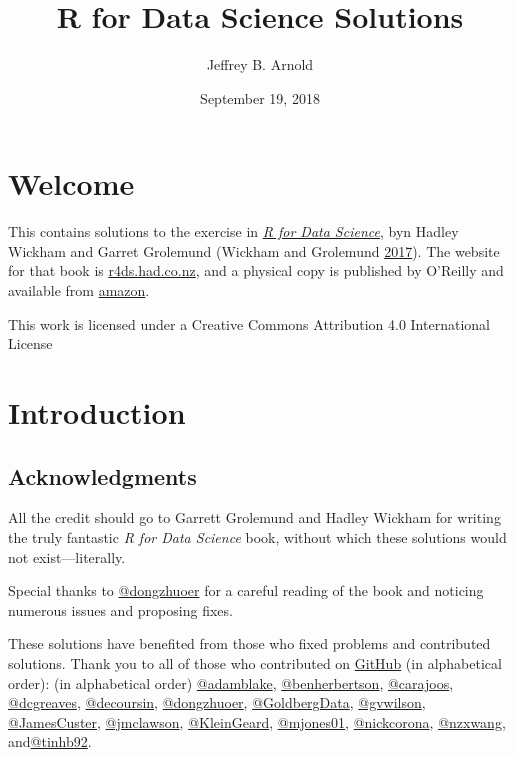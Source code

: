 \documentclass[]{book}
\title{R for Data Science Solutions}
\author{Jeffrey B. Arnold}
\date{September 19, 2018}
\theoremstyle{plain}
\theoremstyle{remark}
\begin{document}
\maketitle

{
\setcounter{tocdepth}{1}
\tableofcontents
}
\hypertarget{welcome}{%
\chapter*{Welcome}\label{welcome}}

This contains solutions to the exercise in
\href{http://amzn.to/2aHLAQ1}{\emph{R for Data Science}}, byn Hadley
Wickham and Garret Grolemund (Wickham and Grolemund
\protect\hyperlink{ref-WickhamGrolemund2017}{2017}). The website for
that book is \href{http://r4ds.had.co.nz/}{r4ds.had.co.nz}, and a
physical copy is published by O'Reilly and available from
\href{http://amzn.to/2aHLAQ1}{amazon}.

This work is licensed under a Creative Commons Attribution 4.0
International License

\hypertarget{introduction}{%
\chapter{Introduction}\label{introduction}}

\hypertarget{acknowledgments}{%
\section*{Acknowledgments}\label{acknowledgments}}

All the credit should go to Garrett Grolemund and Hadley Wickham for
writing the truly fantastic \emph{R for Data Science} book, without
which these solutions would not exist---literally.

Special thanks to \href{https://github.com/dongzhuoer}{@dongzhuoer} for
a careful reading of the book and noticing numerous issues and proposing
fixes.

These solutions have benefited from those who fixed problems and
contributed solutions. Thank you to all of those who contributed on
\href{https://github.com/jrnold/r4ds-exercise-solutions/graphs/contributors}{GitHub}
(in alphabetical order): (in alphabetical order)
\href{https://github.com/adamblake}{@adamblake},
\href{https://github.com/benherbertson}{@benherbertson},
\href{https://github.com/carajoos}{@carajoos},
\href{https://github.com/dcgreaves}{@dcgreaves},
\href{https://github.com/decoursin}{@decoursin},
\href{https://github.com/dongzhuoer}{@dongzhuoer},
\href{https://github.com/GoldbergData}{@GoldbergData},
\href{https://github.com/gvwilson}{@gvwilson},
\href{https://github.com/JamesCuster}{@JamesCuster},
\href{https://github.com/jmclawson}{@jmclawson},
\href{https://github.com/KleinGeard}{@KleinGeard},
\href{https://github.com/mjones01}{@mjones01},
\href{https://github.com/nickcorona}{@nickcorona},
\href{https://github.com/nzxwang}{@nzxwang},
and\href{https://github.com/tinhb92}{@tinhb92}.
\end{document}
